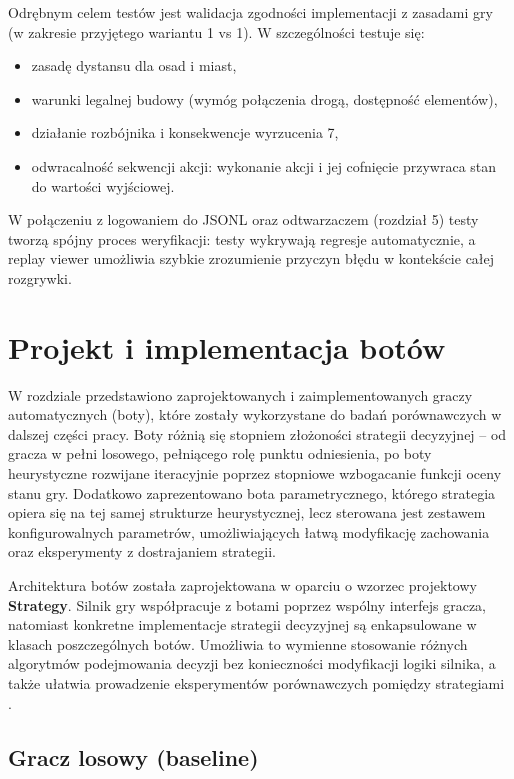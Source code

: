 \documentclass[polish,inz,longabstract]{iithesis}
\begin{document}
Odrębnym celem testów jest walidacja zgodności implementacji z zasadami gry (w zakresie przyjętego wariantu 1 vs 1). W szczególności testuje się:

\begin{itemize}
\item zasadę dystansu dla osad i miast,
\item warunki legalnej budowy (wymóg połączenia drogą, dostępność elementów),
\item działanie rozbójnika i konsekwencje wyrzucenia 7,
\item odwracalność sekwencji akcji: wykonanie akcji i jej cofnięcie przywraca stan do wartości wyjściowej.
\end{itemize}

W połączeniu z logowaniem do JSONL oraz odtwarzaczem (rozdział 5) testy tworzą spójny proces weryfikacji: testy wykrywają regresje automatycznie, a replay viewer umożliwia szybkie zrozumienie przyczyn błędu w kontekście całej rozgrywki.

\chapter{Projekt i implementacja botów}

W rozdziale przedstawiono zaprojektowanych i zaimplementowanych graczy automatycznych (boty), które zostały wykorzystane do badań porównawczych w dalszej części pracy. Boty różnią się stopniem złożoności strategii decyzyjnej – od gracza w pełni losowego, pełniącego rolę punktu odniesienia, po boty heurystyczne rozwijane iteracyjnie poprzez stopniowe wzbogacanie funkcji oceny stanu gry. Dodatkowo zaprezentowano bota parametrycznego, którego strategia opiera się na tej samej strukturze heurystycznej, lecz sterowana jest zestawem konfigurowalnych parametrów, umożliwiających łatwą modyfikację zachowania oraz eksperymenty z dostrajaniem strategii.

Architektura botów została zaprojektowana w oparciu o wzorzec projektowy \textbf{Strategy}. Silnik gry współpracuje z botami poprzez wspólny interfejs gracza, natomiast konkretne implementacje strategii decyzyjnej są enkapsulowane w klasach poszczególnych botów. Umożliwia to wymienne stosowanie różnych algorytmów podejmowania decyzji bez konieczności modyfikacji logiki silnika, a także ułatwia prowadzenie eksperymentów porównawczych pomiędzy strategiami \cite{14}.


\section{Gracz losowy (baseline)}
\label{sec:random}
\end{document}

